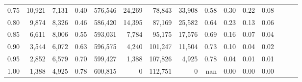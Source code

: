 \begin{tabular}{rrrrrrrrrrrrrrr}
0.75 &  10,921 &  7,131 &  0.40 &  576,546 &   24,269 &   78,843 &   33,908 &  0.58 &  0.30 &  0.22 &      0.08 \\
0.80 &   9,874 &  8,326 &  0.46 &  586,420 &   14,395 &   87,169 &   25,582 &  0.64 &  0.23 &  0.13 &      0.06 \\
0.85 &   6,611 &  8,006 &  0.55 &  593,031 &    7,784 &   95,175 &   17,576 &  0.69 &  0.16 &  0.07 &      0.04 \\
0.90 &   3,544 &  6,072 &  0.63 &  596,575 &    4,240 &  101,247 &   11,504 &  0.73 &  0.10 &  0.04 &      0.02 \\
0.95 &   2,852 &  6,579 &  0.70 &  599,427 &    1,388 &  107,826 &    4,925 &  0.78 &  0.04 &  0.01 &      0.01 \\
1.00 &   1,388 &  4,925 &  0.78 &  600,815 &        0 &  112,751 &        0 &   nan &  0.00 &  0.00 &      0.00 \\
\bottomrule
\end{tabular}

